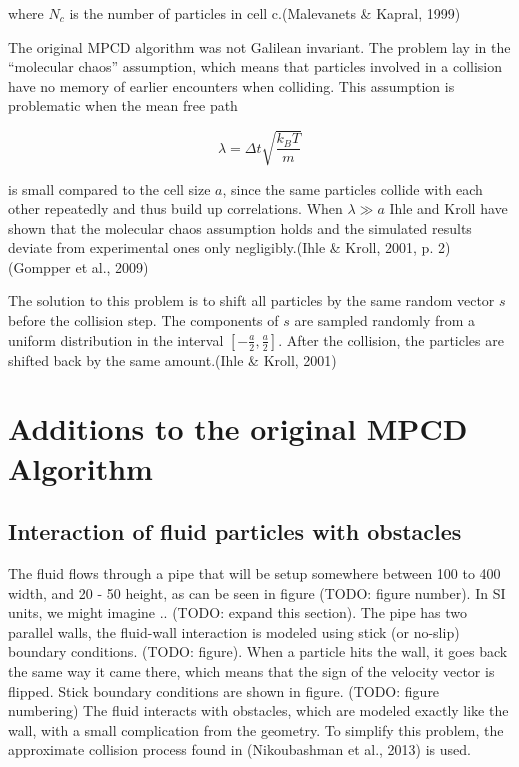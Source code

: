 \documentclass[
]{article}
\begin{document}
where \(N_c\) is the number of particles in cell c.(Malevanets \&
Kapral, 1999)

The original MPCD algorithm was not Galilean invariant. The problem lay
in the ``molecular chaos'' assumption, which means that particles
involved in a collision have no memory of earlier encounters when
colliding. This assumption is problematic when the mean free path

\begin{equation}
\lambda = \Delta t \sqrt{\frac{k_{B}T}{m}}
\end{equation}

is small compared to the cell size \(a\), since the same particles
collide with each other repeatedly and thus build up correlations. When
\(\lambda \gg a\) Ihle and Kroll have shown that the molecular chaos
assumption holds and the simulated results deviate from experimental
ones only negligibly.(Ihle \& Kroll, 2001, p. 2)(Gompper et al., 2009)

The solution to this problem is to shift all particles by the same
random vector \(s\) before the collision step. The components of \(s\)
are sampled randomly from a uniform distribution in the interval
\([-\frac{a}{2}, \frac{a}{2}]\). After the collision, the particles are
shifted back by the same amount.(Ihle \& Kroll, 2001)

\hypertarget{additions-to-the-original-mpcd-algorithm}{%
\section{Additions to the original MPCD
Algorithm}\label{additions-to-the-original-mpcd-algorithm}}

\hypertarget{interaction-of-fluid-particles-with-obstacles}{%
\subsection{Interaction of fluid particles with
obstacles}\label{interaction-of-fluid-particles-with-obstacles}}

The fluid flows through a pipe that will be setup somewhere between 100
to 400 width, and 20 - 50 height, as can be seen in figure (TODO: figure
number). In SI units, we might imagine .. (TODO: expand this section).
The pipe has two parallel walls, the fluid-wall interaction is modeled
using stick (or no-slip) boundary conditions. (TODO: figure). When a
particle hits the wall, it goes back the same way it came there, which
means that the sign of the velocity vector is flipped. Stick boundary
conditions are shown in figure. (TODO: figure numbering) The fluid
interacts with obstacles, which are modeled exactly like the wall, with
a small complication from the geometry. To simplify this problem, the
approximate collision process found in (Nikoubashman et al., 2013) is
used.
\end{document}
